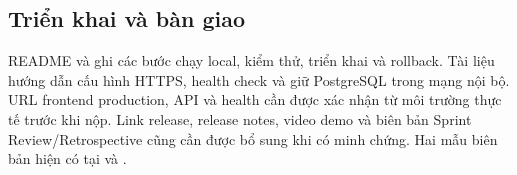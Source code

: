 \documentclass[a4paper]{article}
\begin{document}
\subsection{Triển khai và bàn giao}
README và  ghi các bước chạy local, kiểm thử, triển khai và rollback. Tài liệu hướng dẫn cấu hình HTTPS, health check và giữ PostgreSQL trong mạng nội bộ. URL frontend production, API và health cần được xác nhận từ môi trường thực tế trước khi nộp. Link release, release notes, video demo và biên bản Sprint Review/Retrospective cũng cần được bổ sung khi có minh chứng. Hai mẫu biên bản hiện có tại  và .
\end{document}
